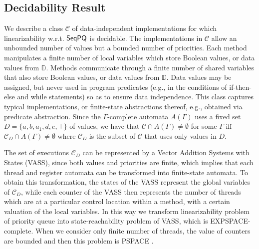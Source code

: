 %



\subsection{Decidability Result}
\label{subsec:combine step-by-step linearizability and co-regular}

We describe a class $\mathcal{C}$ of data-independent implementations for which linearizability w.r.t. $\mathsf{SeqPQ}$ is decidable. The implementations in $\mathcal{C}$ allow an unbounded number of values but a bounded number of priorities. Each method manipulates a finite number of local variables which store Boolean values, or data values from $\mathbb{D}$. Methods communicate through a finite number of shared variables that also store Boolean values, or data values from $\mathbb{D}$. Data values may be assigned, but never used in program predicates (e.g., in the conditions of if-then-else and while statements) so as to ensure data independence. This class captures typical implementations, or finite-state abstractions thereof, e.g., obtained via predicate abstraction. Since the $\Gamma$-complete automata $A(\Gamma)$ uses a fixed set $D=\{a,b,a_1,d,e,\top\}$ of values, we have that $\mathcal{C}\cap A(\Gamma)\neq\emptyset$ for some $\Gamma$ iff $\mathcal{C}_D\cap A(\Gamma)\neq\emptyset$ where $\mathcal{C}_D$ is the subset of $\mathcal{C}$ that uses only values in $D$. 

The set of executions $\mathcal{C}_D$ can be represented by a Vector Addition Systems with States (VASS), since both values and priorities are finite, which implies that each thread and register automata can be transformed into finite-state automata. To obtain this transformation, the states of the VASS represent the global variables of $\mathcal{C}_D$, while each counter of the VASS then represents the number of threads which are at a particular control location within a method, with a certain valuation of the local variables. In this way we transform linearizability problem of priority queue into state-reachability problem of VASS, which is EXPSPACE-complete. When we consider only finite number of threads, the value of counters are bounded and then this problem is PSPACE \cite{DBLP:conf/ac/Esparza96}.

